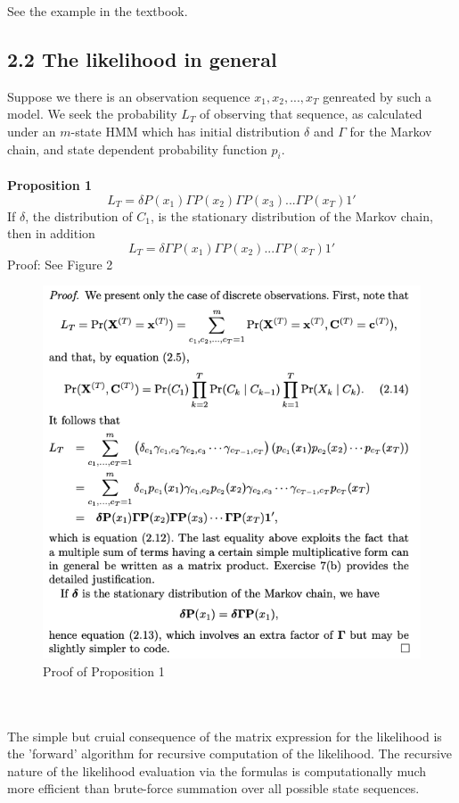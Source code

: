 \documentclass{article}
\begin{document}
See the example in the textbook.

\subsection*{2.2 The likelihood in general}
Suppose we there is an observation sequence $x_1, x_2, ..., x_T$ genreated by such a model. We seek the probability $L_T$ of observing that sequence, as calculated under an $m$-state HMM which has initial distribution $\delta$ and $\Gamma$ for the Markov chain, and state dependent probability function $p_i$. \\
\\
\textbf{Proposition 1}
$$L_T = \delta P(x_1) \Gamma P(x_2) \Gamma P(x_3) ... \Gamma P(x_T) 1'$$
If $\delta$, the distribution of $C_1$, is the stationary distribution of the Markov chain, then in addition
$$L_T = \delta \Gamma P(x_1) \Gamma P(x_2) ... \Gamma P(x_T) 1'$$
Proof: See Figure 2
\begin{figure}
    \includegraphics[width = 12cm]{proof.png}
    \caption{Proof of Proposition 1}
\end{figure}
\\
\\
The simple but cruial consequence of the matrix expression for the likelihood is the 'forward' algorithm for recursive computation of the likelihood. The recursive nature of the likelihood evaluation via the formulas is computationally much more efficient than brute-force summation over all possible state sequences. \\
\end{document}
